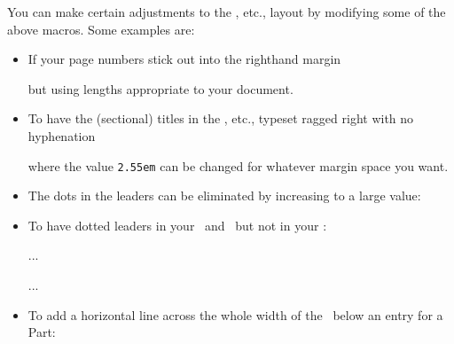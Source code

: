     You can make certain adjustments to the \toc, etc., layout by modifying
some of the above macros. Some examples are:
 \begin{itemize}
 \item If your page numbers stick out into the righthand margin
  \begin{lcode}
  \renewcommand{\@pnumwidth}{3em} 
  \renewcommand{\@tocrmarg}{4em}
  \end{lcode}
 but using lengths appropriate to your document.

 \item To have the (sectional) titles in the \toc, etc., typeset ragged 
right with no  hyphenation
 \begin{lcode}
 \renewcommand{\@tocrmarg}{2.55em plus1fil}
 \end{lcode}
 where the value \texttt{2.55em} can be changed for whatever 
margin space you want.

 \item The dots in the leaders can be eliminated by increasing \cmd{\@dotsep}
 to a large value:
  \begin{lcode}
  \renewcommand{\@dotsep}{10000}
  \end{lcode}

 \item To have dotted leaders in your \toc\ and \lof\ but not in your \lot:
 \begin{lcode}
 ...
 \tableofcontents
 \makeatletter \renewcommand{\@dotsep}{10000} \makeatother
 \listoftables
 \makeatletter \renewcommand{\@dotsep}{4.5} \makeatother
 \listoffigures
 ...
 \end{lcode}

 \item To add a horizontal line across the whole width of the \toc\ below 
 an entry for a Part:
 \begin{lcode}

\end{lcode}
\end{itemize}
